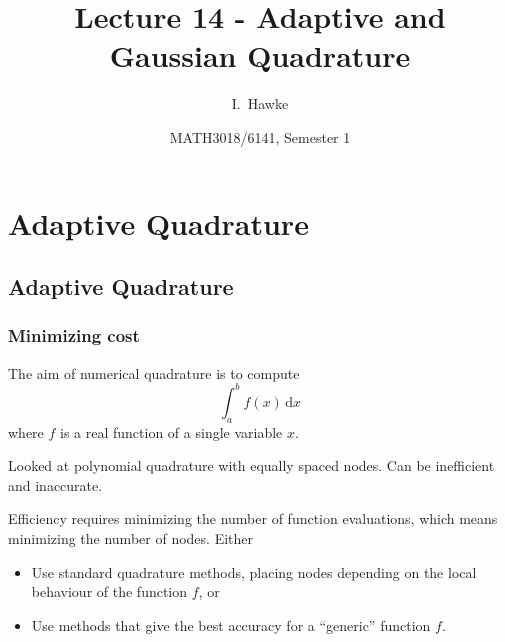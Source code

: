 \documentclass{beamer}
\title[Lecture 14] %
{Lecture 14 - Adaptive and Gaussian Quadrature}
\author[I. Hawke] %
{I.~Hawke}
\institute[University of Southampton] %
{
  School of Mathematics, \\
  University of Southampton, UK
}
\date[Semester 1] %
{MATH3018/6141, Semester 1}
\begin{document}
\begin{frame}
  \titlepage
\end{frame}

\section{Adaptive Quadrature}

\subsection{Adaptive Quadrature}

\begin{frame}
  \frametitle{Minimizing cost}

  The aim of numerical quadrature is to compute
  \begin{equation*}
    \int_a^b f(x) \, \text{d}x
  \end{equation*}
  where $f$ is a real function of a single variable $x$.

  \vspace{1ex}

  Looked at polynomial quadrature with equally spaced nodes. Can be
  inefficient and inaccurate.  \pause

  \vspace{1ex}

  Efficiency requires minimizing the number of function evaluations,
  which means minimizing the number of nodes.  Either
  \begin{itemize}
  \item Use standard quadrature methods, placing nodes depending on
    the local behaviour of the function $f$, or \pause
  \item Use methods that give the best accuracy for a ``generic''
    function $f$.
  \end{itemize}

\end{frame}
\end{document}
